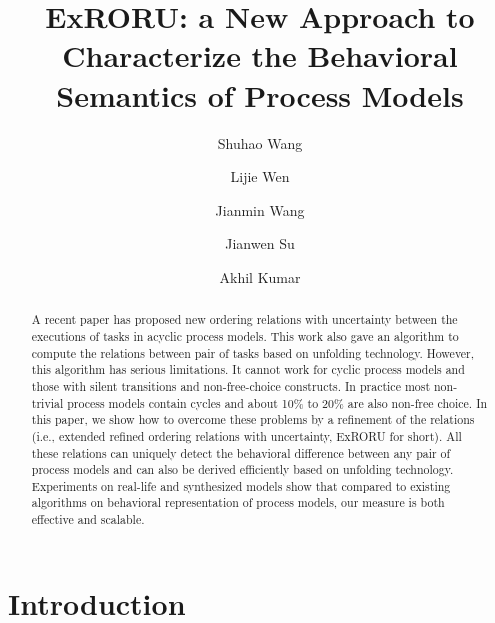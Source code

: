 \documentclass{llncs}
\begin{document}
\frontmatter 
\pagestyle{headings}

\mainmatter
\title{ExRORU: a New Approach to Characterize the Behavioral Semantics of Process Models}

\author[$1$]{Shuhao Wang}
\author[$1$]{Lijie Wen}
\author[$1$]{Jianmin Wang}
\author[$2$]{Jianwen Su}
\author[$3$]{Akhil Kumar}
\institute{}

\maketitle

\begin{abstract}
A recent paper has proposed new ordering relations with uncertainty between the executions of tasks in acyclic process models. This work also gave an algorithm to compute the relations between pair of tasks based on unfolding technology. However, this algorithm has serious limitations. It cannot work for cyclic process models and those with silent transitions and non-free-choice constructs. In practice most non-trivial process models contain cycles and about 10\% to 20\% are also non-free choice. In this paper, we show how to overcome these problems by a refinement of the relations (i.e., extended refined ordering relations with uncertainty, ExRORU for short). All these relations can uniquely detect the behavioral difference between any pair of process models and can also be derived efficiently based on unfolding technology. Experiments on real-life and synthesized models show that compared to existing algorithms on behavioral representation of process models, our measure is both effective and scalable.
\end{abstract}

\section{Introduction}\label{sec:introduction}
\end{document}
